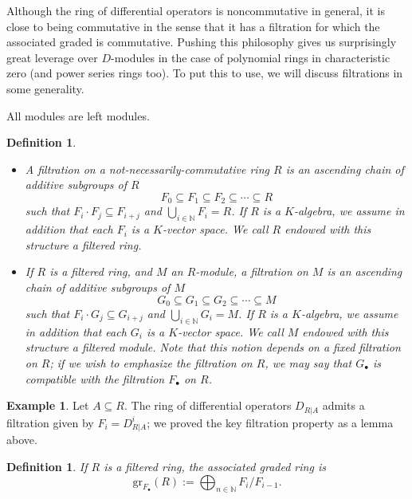 \documentclass[11pt]{book}
\newtheorem{definition}[theorem]{Definition}
\numberwithin{equation}{section}
\numberwithin{theorem}{chapter}
\theoremstyle{definition}
\newtheorem{example}[theorem]{Example}
\newtheorem*{basic properties}{Basic Properties}
\newtheorem*{Important Remark}{Important Remark}
\theoremstyle{remark}
\newcommand{\NN}{\mathbb{N}}
\begin{document}
Although the ring of differential operators is noncommutative in general, it is close to being commutative in the sense that it has a filtration for which the associated graded is commutative. Pushing this philosophy gives us surprisingly great leverage over $D$-modules in the case of polynomial rings in characteristic zero (and power series rings too). To  put this to use, we will discuss filtrations in some generality.


All modules are left modules.

\begin{definition}
	\begin{itemize}
	\item A \emph{filtration} on a not-necessarily-commutative ring $R$ is an ascending chain of additive subgroups of $R$
	\[ F_0 \subseteq F_1 \subseteq F_2 \subseteq \cdots \subseteq R\]
	such that $F_i \cdot F_j \subseteq F_{i+j}$ and $\bigcup_{i\in \NN} F_i = R$. If $R$ is a $K$-algebra, we assume in addition that each $F_i$ is a $K$-vector space. We call $R$ endowed with this structure a \emph{filtered ring}.
	\item If $R$ is a filtered ring, and $M$ an $R$-module, a \emph{filtration} on $M$ is an ascending chain of additive subgroups of $M$
	\[ G_0 \subseteq G_1 \subseteq G_2 \subseteq \cdots \subseteq M\]
	such that $F_i \cdot G_j \subseteq G_{i+j}$ and $\bigcup_{i\in \NN} G_i = M$. If $R$ is a $K$-algebra, we assume in addition that each $G_i$ is a $K$-vector space. We call $M$ endowed with this structure a \emph{filtered module}. Note that this notion depends on a fixed filtration on $R$; if we wish to emphasize the filtration on $R$, we may say that $G_\bullet$ is compatible with the filtration $F_\bullet$ on $R$.
	\end{itemize}
\end{definition}

\begin{example}
	Let $A\subseteq R$. The ring of differential operators $D_{R|A}$ admits a filtration given by $F_i=D^i_{R|A}$; we proved the key filtration property as a lemma above.
\end{example}

\begin{definition}
	If $R$ is a filtered ring, the \emph{associated graded ring} is
	\[ \mathrm{gr}_{F_\bullet}(R) := \bigoplus_{n \in \NN} F_i/F_{i-1}. \]
\end{definition}
\end{document}
